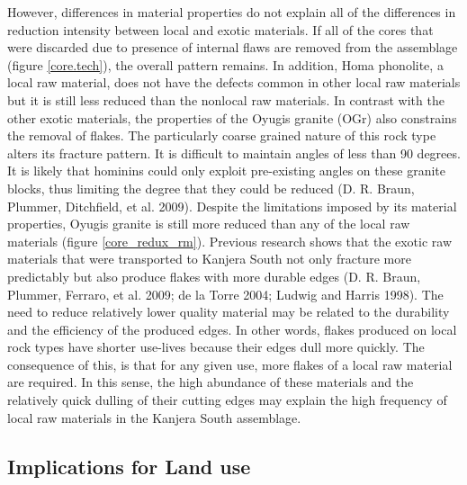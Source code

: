 \documentclass[]{elsarticle} %
\begin{document}
However, differences in material properties do not explain all of the
differences in reduction intensity between local and exotic materials.
If all of the cores that were discarded due to presence of internal
flaws are removed from the assemblage (figure \ref{core.tech}), the
overall pattern remains. In addition, Homa phonolite, a local raw
material, does not have the defects common in other local raw materials
but it is still less reduced than the nonlocal raw materials. In
contrast with the other exotic materials, the properties of the Oyugis
granite (OGr) also constrains the removal of flakes. The particularly
coarse grained nature of this rock type alters its fracture pattern. It
is difficult to maintain angles of less than 90 degrees. It is likely
that hominins could only exploit pre-existing angles on these granite
blocks, thus limiting the degree that they could be reduced (D. R.
Braun, Plummer, Ditchfield, et al. 2009). Despite the limitations
imposed by its material properties, Oyugis granite is still more reduced
than any of the local raw materials (figure \ref{core_redux_rm}).
Previous research shows that the exotic raw materials that were
transported to Kanjera South not only fracture more predictably but also
produce flakes with more durable edges (D. R. Braun, Plummer, Ferraro,
et al. 2009; de la Torre 2004; Ludwig and Harris 1998). The need to
reduce relatively lower quality material may be related to the
durability and the efficiency of the produced edges. In other words,
flakes produced on local rock types have shorter use-lives because their
edges dull more quickly. The consequence of this, is that for any given
use, more flakes of a local raw material are required. In this sense,
the high abundance of these materials and the relatively quick dulling
of their cutting edges may explain the high frequency of local raw
materials in the Kanjera South assemblage.

\hypertarget{implications-for-land-use}{%
\subsection{Implications for Land use}\label{implications-for-land-use}}
\end{document}

